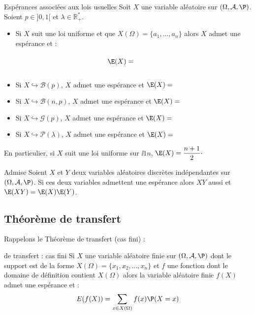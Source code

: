 \documentclass[french,11pt,twoside]{VcCours}
\begin{document}
\begin{Theoreme}{Espérances associées aux lois usuelles}
Soit $X$ une variable aléatoire sur $(\Omega, \mathcal{A}, \P)$. Soient $p \in ]0,1[$ et $\lambda \in \mathbb{R}_+^{*}$.

\begin{itemize}
\item Si $X$ suit une loi uniforme et que $X(\Omega)= \lbrace a_1, \ldots, a_n \rbrace$ alors $X$ admet une espérance et :
$$ \E(X) = \phantom{\dfrac{1}{n} \sum_{i = 1}^n a_i}$$
\item Si $X \hookrightarrow \mathcal{B}(p)$, $X$ admet une espérance et $\E(X)=$
\item Si $X \hookrightarrow \mathcal{B}(n,p)$, $X$ admet une espérance et $\E(X)=$
\item Si $X \hookrightarrow \mathcal{G}(p)$, $X$ admet une espérance et $\E(X)= $
\item Si $X \hookrightarrow \mathcal{P}(\lambda)$, $X$ admet une espérance et $\E(X)=$
\end{itemize}
\end{Theoreme}

\begin{Demonstration}{}

\newpage

\vspace*{3cm}
\end{Demonstration}

\begin{Remarque}{} En particulier, si $X$ suit une loi uniforme sur $\ii{1}{n}$, $\E(X) = \dfrac{n+1}{2} \cdot$
\end{Remarque}

\begin{Proposition}{Admise} Soient $X$ et $Y$ deux variables aléatoires discrètes indépendantes sur $(\Omega, \mathcal{A}, \P)$. Si ces deux variables admettent une espérance alors $XY$ aussi et $\E(XY)=\E(X)\E(Y)$.
\end{Proposition}
\subsection{Théorème de transfert}

Rappelons le Théorème de transfert (cas fini) : 


\begin{Theoreme}{de transfert : cas fini}
Si $X$ une variable aléatoire finie sur $(\Omega, \mathcal{A}, \P)$ dont le support est de la forme $X(\Omega) = \{x_1, x_2, \ldots, x_n\}$ et $f$ une fonction dont le domaine de définition contient $X(\Omega)$ alors la variable aléatoire finie $f(X)$ admet une espérance et :
 $$ E(f(X)) = \sum_{x \in X(\Omega)} f(x) \P(X=x)$$
 \end{Theoreme}
\end{document}
